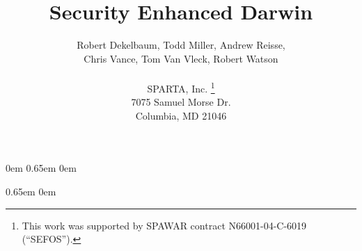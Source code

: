 \documentclass{article}
\begin{document}
\makeatletter
\def\bstctlcite#1{\@bsphack
  \@for\@citeb:=#1\do{%
    \edef\@citeb{\expandafter\@firstofone\@citeb}%
    \if@filesw\immediate\write\@auxout{\string\citation{\@citeb}}\fi}%
  \@esphack}
\makeatother

\title{Security Enhanced Darwin}
\author{
Robert Dekelbaum, Todd Miller, Andrew Reisse, \\
Chris Vance, Tom Van Vleck, Robert Watson \\
\\
SPARTA, Inc.
\thanks{This work was supported by SPAWAR contract N66001-04-C-6019
(``SEFOS'').}
\\
7075 Samuel Morse Dr.\\
Columbia, MD 21046
}

{\Large
\maketitle
\thispagestyle{empty}
}
\newpage

\pagestyle{fancy}
\fancyhf{}
\chead{}
\cfoot{\thepage}
\renewcommand{\headrulewidth}{0pt}
\renewcommand{\footrulewidth}{0pt}
\parskip0em
\clearpage  
\tableofcontents
\parskip0.65em
\parindent0em
\clearpage  

\parskip0.65em
\parindent0em



















\newpage


\end{document}
